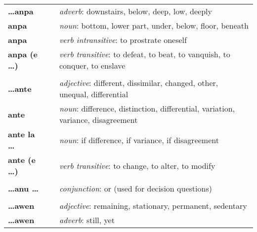 \begin{supertabular}{p{2,5cm}|ll}
    \textbf{\dots anpa}          &  & \textit{adverb}: downstairs, below, deep, low, deeply                                                      \\
    \textbf{anpa}                &  & \textit{noun}: bottom, lower part, under, below, floor, beneath                                            \\
    \textbf{anpa}                &  & \textit{verb intransitive}: to prostrate oneself                                                           \\
    \textbf{anpa (e \dots)}      &  & \textit{verb transitive}: to defeat, to beat, to vanquish, to conquer, to enslave                          \\
                                 &  &                                                                                                            \\
    \textbf{\dots ante}          &  & \textit{adjective}: different, dissimilar, changed, other, unequal, differential                           \\
    \textbf{ante}                &  & \textit{noun}: difference, distinction, differential, variation, variance, disagreement                    \\
    \textbf{ante la \dots}       &  & \textit{noun}: if difference, if variance, if disagreement                                                 \\
    \textbf{ante (e \dots)}      &  & \textit{verb transitive}: to change, to alter, to modify                                                   \\
                                 &  &                                                                                                            \\
    \textbf{\dots anu \dots}     &  & \textit{conjunction}: or (used for decision questions)                                                     \\
                                 &  &                                                                                                            \\
    \textbf{\dots awen}          &  & \textit{adjective}: remaining, stationary, permanent, sedentary                                            \\
    \textbf{\dots awen}          &  & \textit{adverb}: still, yet                                                                                \\

\end{supertabular}
